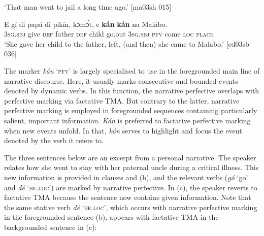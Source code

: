 \glt ‘That man went to jail a long time ago.’ [ma03sh 015]
\z


\ea%
    \label{ex:key:324}
    \gll E    gí  di  papá  di  pikín,  kɔmɔ́t,  e    \textbf{kán}
\textbf{kán}   na  Malábo.\\
\textsc{3sg.sbj}  give  \textsc{def}  father  \textsc{def}  child  go.out  \textsc{3sg.sbj}  \textsc{pfv}
come  \textsc{loc}  \textsc{place}\\

\glt ‘She gave her child to the father, left, (and then) she came to Malabo.’ [ed03sb 036]
\z


The marker \textit{kán} ‘\textsc{pfv}’ is largely specialised to use in the foregrounded main line of narrative discourse. Here, it usually marks consecutive and bounded events denoted by dynamic verbs. In this function, the narrative perfective overlaps with perfective marking via factative TMA. But contrary to the latter, narrative perfective marking is employed in foregrounded sequences containing particularly salient, important information. \textit{Kán} is preferred to factative perfective marking when new events unfold. In that, \textit{kán} serves to highlight and focus the event denoted by the verb it refers to. 


The three sentences below are an excerpt from a personal narrative. The speaker relates how she went to stay with her paternal uncle during a critical illness. This new information is provided in clauses  and (b), and the relevant verbs (\textit{gó} ‘go’ and \textit{dé} \textsc{‘be.loc’)} are marked by narrative perfective. In (c), the speaker reverts to factative TMA because the sentence now contains given information. Note that the same stative verb \textit{dé} \textsc{‘be.loc’,} which occurs with narrative perfective marking in the foregrounded sentence (b), appears with factative TMA in the backgrounded sentence in (c): 



